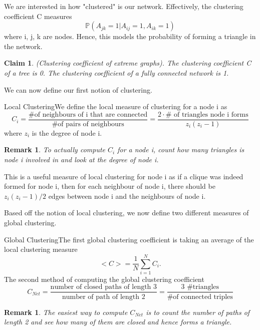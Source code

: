 \documentclass[twoside]{article}
\newtheorem{claim}[theorem]{Claim}
\newtheorem{remark}[theorem]{Remark}
\begin{document}
We are interested in how "clustered" is our network. Effectively, the clustering coefficient C measures
$$
\mathbb{P}(A_{jk} = 1| A_{ij} = 1, A_{ik} = 1)
$$
where i, j, k are nodes. Hence, this models the probability of forming a triangle in the network.

\begin{claim}(Clustering coefficient of extreme graphs). The clustering coefficient C of a tree is 0. The clustering coefficient of a fully connected network is 1.
\end{claim}

We can now define our first notion of clustering.

\begin{definition_exam}{Local Clustering}{}We define the local measure of clustering for a node i as 
$$
C_i = \frac{\text{\# of neighbours of i that are connected}}{\text{\# of pairs of neighbours}} = \frac{2 \cdot \# \text{ of triangles node i forms}}{z_i(z_i - 1)}
$$
where $z_i$ is the degree of node i.
\end{definition_exam}

\begin{remark} To actually compute $C_i$ for a node i, count how many triangles is node i involved in and look at the degree of node i.
\end{remark}

This is a useful measure of local clustering for node i as if a clique was indeed formed for node i, then for each neighbour of node i, there should be $z_i(z_i - 1)/2$ edges between node i and the neighbours of node i.

Based off the notion of local clustering, we now define two different measures of global clustering.

\begin{definition_exam}{Global Clustering}{}The first global clustering coefficient is taking an average of the local clustering measure
$$
<C> = \frac{1}{N}\sum_{i=1}^NC_i.
$$
The second method of computing the global clustering coefficient
$$
C_{Net} = \frac{\text{number of closed paths of length 3}}{\text{number of path of length 2}} = \frac{\text{3 \# triangles}}{\text{\# of connected triples}}
$$
\end{definition_exam}
\begin{remark} The easiest way to compute $C_{Net}$ is to count the number of paths of length 2 and see how many of them are closed and hence forms a triangle.
\end{remark}
\end{document}
